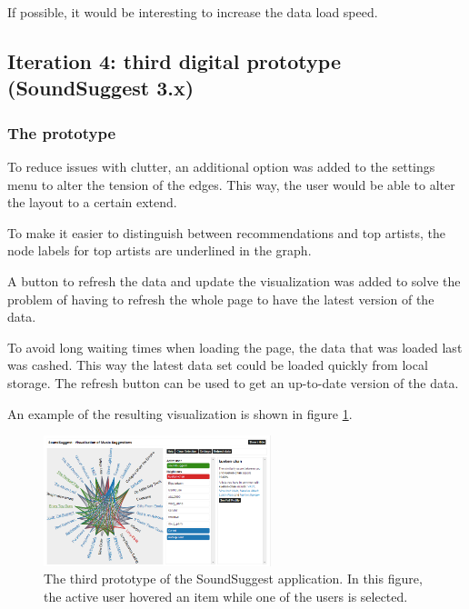 If possible, it would be interesting to increase the data load speed.


\subsection{Iteration 4: third digital prototype (SoundSuggest 3.x)}\label{chapter:prototype:section:soundsuggest3}

\subsubsection{The prototype}\label{chapter:prototype:section:soundsuggest3:prototype}


To reduce issues with clutter, an additional option was added to the settings menu to alter the tension of the edges. This way, the user would be able to alter the layout to a certain extend.

To make it easier to distinguish between recommendations and top artists, the node labels for top artists are underlined in the graph.

A button to refresh the data and update the visualization was added to solve the problem of having to refresh the whole page to have the latest version of the data.

To avoid long waiting times when loading the page, the data that was loaded last was cashed. This way the latest data set could be loaded quickly from local storage. The refresh button can be used to get an up-to-date version of the data.

An example of the resulting visualization is shown in figure \ref{figure:prototype_soundsuggest3}.

\begin{figure}
	\begin{center}
		\includegraphics[width=250px]{img/prototype_soundsuggest3_click_user_hover_item}
	\end{center}
	\caption{The third prototype of the SoundSuggest application. In this figure, the active user hovered an item while one of the users is selected.}
	\label{figure:prototype_soundsuggest3}
\end{figure}



